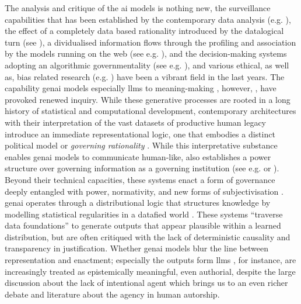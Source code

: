 \greensquare
The analysis and critique of the \gls{ai} models is nothing new, the surveillance capabilities that has been established by the contemporary data
analysis (e.g. \cite{Krasmann2017}), the effect of a completely data based
rationality introduced by the datalogical turn (see \cite{Clough2015}), a
dividualised information flows through the profiling and association by the
models running on the web (see e.g. \cite{Cheney2011}), and the decision-making
systems adopting an algorithmic
governmentality (see e.g.
\cite{rouvroy2007}), and various ethical, as well as, bias related research
(e.g. \cite{kordzadeh2022}) have been a vibrant field in the last years. The
capability \gls{genai} models especially \glspl{llm} to meaning-making
\parencite[]{gretzky2024, mishra2024, dishon2024}, however, , have provoked
renewed inquiry. While these generative processes are rooted in a long history
of statistical and computational development, contemporary architectures with
their interpretation of the vast datasets of productive human legacy introduce
an immediate representational logic, one that embodies a distinct political
model or \emph{governing rationality} \parencite[2]{amoore2024}. While this
interpretative substance
enables \gls{genai} models to communicate human-like, also establishes a power
structure over governing information as a governing institution (see e.g.
\cite{mackenzie2021} or \cite{dishon2024}). Beyond their technical capacities, these systems enact a form of governance deeply entangled with power, normativity, and new forms of subjectivisation \parencite{eloff2021}. \Gls{genai} operates through a distributional logic that structures knowledge by modelling statistical regularities in a datafied world \parencite{amoore2023}. These systems “traverse data foundations” to generate outputs that appear plausible within a learned distribution, but are often critiqued with the lack of deterministic causality and transparency in justification. Whether \gls{genai} models blur the line between representation and enactment; especially the outputs form \glspl{llm} , for instance, are increasingly treated as epistemically meaningful, even authorial, despite the large discussion about the lack of intentional agent which brings us to an even richer debate and literature about the agency in human autorship.



